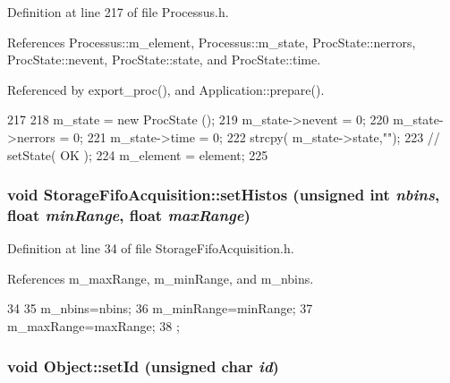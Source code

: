 Definition at line 217 of file Processus.h.

References Processus::m\_\-element, Processus::m\_\-state, ProcState::nerrors, ProcState::nevent, ProcState::state, and ProcState::time.

Referenced by export\_\-proc(), and Application::prepare().


\begin{DoxyCode}
217                                      {
218     m_state = new ProcState ();
219     m_state->nevent  = 0;
220     m_state->nerrors = 0;
221     m_state->time    = 0;
222     strcpy( m_state->state,"");
223     //  setState( OK );
224     m_element = element;
225   }
\end{DoxyCode}
\hypertarget{classStorageFifoAcquisition_af1482fb0a9e3cd5210902cf96b3f5313}{
\subsubsection[{setHistos}]{\setlength{\rightskip}{0pt plus 5cm}void StorageFifoAcquisition::setHistos (unsigned int {\em nbins}, \/  float {\em minRange}, \/  float {\em maxRange})}}
\label{classStorageFifoAcquisition_af1482fb0a9e3cd5210902cf96b3f5313}


Definition at line 34 of file StorageFifoAcquisition.h.

References m\_\-maxRange, m\_\-minRange, and m\_\-nbins.


\begin{DoxyCode}
34                                                                     {
35     m_nbins=nbins;
36     m_minRange=minRange;
37     m_maxRange=maxRange;
38   };
\end{DoxyCode}
\hypertarget{classObject_a398fe08cba594a0ce6891d59fe4f159f}{
\subsubsection[{setId}]{\setlength{\rightskip}{0pt plus 5cm}void Object::setId (unsigned char {\em id})}}
\label{classObject_a398fe08cba594a0ce6891d59fe4f159f}


